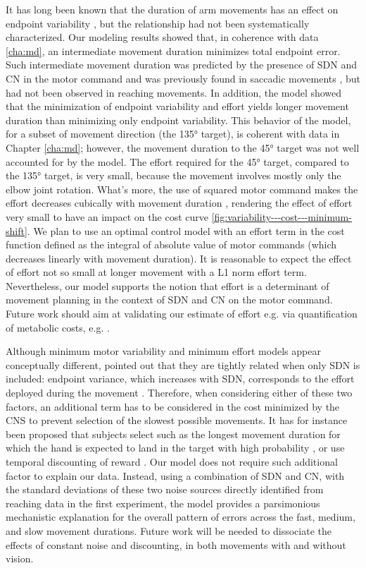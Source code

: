 It has long been known that the duration of arm movements has an effect on endpoint variability  \cite{Woodworth1899, Fitts1954}, but the relationship had not been systematically characterized. 
Our modeling results showed that, in coherence with data \ref{cha:md}, an intermediate movement duration minimizes total endpoint error. 
Such intermediate movement duration was predicted by the presence of SDN and CN in the motor command and was previously found in saccadic movements \cite{VanBeers2008}, but had not been observed in reaching movements. 
In addition, the model showed that the minimization of endpoint variability and effort yields longer movement duration than minimizing only endpoint variability.
This behavior of the model, for a subset of movement direction (the \ang{135} target), is coherent with data in Chapter \ref{cha:md}; however, the movement duration to the \ang{45} target was not well accounted for by the model. The effort required for the \ang{45} target, compared to the \ang{135} target, is very small, because the movement involves mostly only the elbow joint rotation. 
What's more, the use of squared motor command makes the effort decreases cubically with movement duration \cite{Shadmehr2016}, rendering the effect of effort very small to have an impact on the cost curve \ref{fig:variability---cost---minimum-shift}. 
We plan to use an optimal control model with an effort term in the cost function defined as the integral of absolute value of motor commands (which decreases linearly with movement duration).
It is reasonable to expect the effect of effort not so small at longer movement with a L1 norm effort term.
Nevertheless, our model supports the notion that effort is a determinant of movement planning in the context of SDN and CN on the motor command. 
Future work should aim at validating our estimate of effort e.g. via quantification of metabolic costs, e.g. \cite{Huang2012}.

Although minimum motor variability and minimum effort models appear conceptually different, \cite{OSullivan2009} pointed out that they are tightly related when only SDN is included: endpoint variance, which increases with SDN, corresponds to the effort deployed during the movement \cite{OSullivan2009}. 
Therefore, when considering either of these two factors, an additional term has to be considered in the cost minimized by the CNS to prevent selection of the slowest possible movements. 
It has for instance been proposed that subjects select such as the longest movement duration for which the hand is expected to land in the target with high probability \cite{Hoff1994,Harris1998,Harris2006}, or use temporal discounting of reward \cite{Shadmehr2010, Rigoux2012, Haith2012}. Our model does not require such additional factor to explain our data.
Instead, using a combination of SDN and CN, with the standard deviations of these two noise sources directly identified from reaching data in the first experiment, the model provides a parsimonious mechanistic explanation for the overall pattern of errors across the fast, medium, and slow movement durations.  
Future work will be needed to dissociate the effects of constant noise and discounting, in both movements with and without vision.

